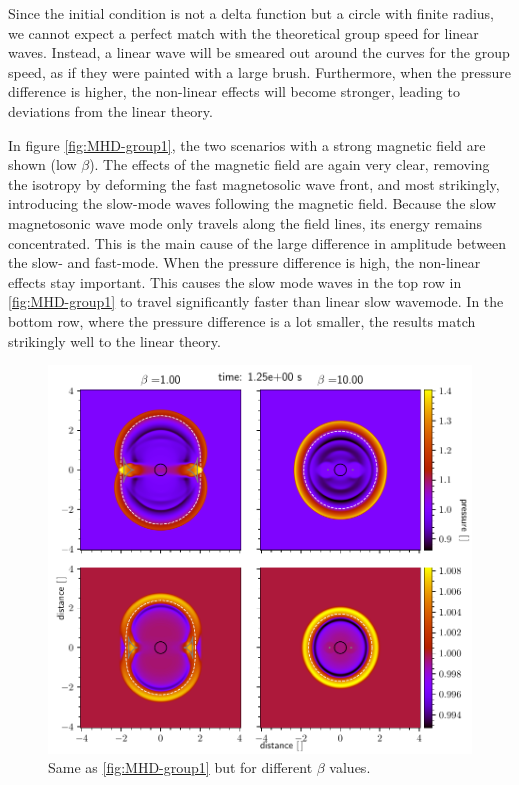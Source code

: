 Since the initial condition is not a delta function but a circle with finite radius, we cannot expect a perfect match with the theoretical group speed for linear waves.
Instead, a linear wave will be smeared out around the curves for the group speed, as if they were painted with a large brush.
Furthermore, when the pressure difference is higher, the non-linear effects will become stronger, leading to deviations from the linear theory.

In figure \cref{fig:MHD-group1}, the two scenarios with a strong magnetic field are shown (low $\beta$).
The effects of the magnetic field are again very clear, removing the isotropy by deforming the fast magnetosolic wave front, and most strikingly, introducing the slow-mode waves following the magnetic field.
Because the slow magnetosonic wave mode only travels along the field lines, its energy remains concentrated. This is the main cause of the large difference in amplitude between the slow- and fast-mode.
When the pressure difference is high, the non-linear effects stay important. 
This causes the slow mode waves in the top row in \cref{fig:MHD-group1} to travel significantly faster than linear slow wavemode.
In the bottom row, where the pressure difference is a lot smaller, the results match strikingly well to the linear theory.

\begin{figure}[H]
	\centering
	\includegraphics[width=\linewidth]{images/group-speed-pressure2.pdf}
	\caption{Same as \cref{fig:MHD-group1} but for different $\beta$ values.}
	\label{fig:MHD-group2}
\end{figure}

